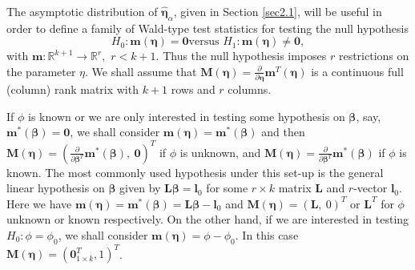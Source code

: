 \documentclass[a4paper]{article}%
\begin{document}
The asymptotic distribution of $\widehat{\boldsymbol{\eta}}_{\alpha}$, given
in Section \ref{sec2.1}, will be useful in order to define a family of
Wald-type test statistics for testing the null hypothesis
\begin{equation}
H_{0}:\boldsymbol{m}\left(  \boldsymbol{\eta}\right)  =\boldsymbol{0}\text{
versus }H_{1}:\boldsymbol{m}\left(  \boldsymbol{\eta}\right)  \neq
\boldsymbol{0}, \label{EQ:hyp}%
\end{equation}
with $\boldsymbol{m}:\mathbb{R}^{k+1}\rightarrow\mathbb{R}^{r},$ $r<k+1$. Thus the null hypothesis imposes $r$ restrictions on the parameter $\eta$.  We
shall assume that $\boldsymbol{M}\left(  \boldsymbol{\eta}\right)
=\frac{\partial}{\partial\boldsymbol{\eta}}\boldsymbol{m}^{T}\left(
\boldsymbol{\eta}\right)  $ is a continuous full (column) rank matrix with $k+1$ rows
and $r$ columns.

If $\phi$ is known or we are only interested in testing some hypothesis on
$\boldsymbol{\beta}$, say, $\boldsymbol{m}^{\ast}\left( \boldsymbol{\beta
}\right) =\boldsymbol{0}$, we shall consider $\boldsymbol{m}\left(
\boldsymbol{\eta}\right) =\boldsymbol{m}^{\ast}\left( \boldsymbol{\beta
}\right) $ and then $\boldsymbol{M}\left( \boldsymbol{\eta}\right)  = \left(
\frac{\partial}{\partial\boldsymbol{\beta}^{T}}\boldsymbol{m}^{\ast}\left(
\boldsymbol{\beta}\right) , \ \boldsymbol{0}\right) ^{T}$ if $\phi$ is
unknown, and $\boldsymbol{M}\left( \boldsymbol{\eta}\right)  = \frac{\partial
}{\partial\boldsymbol{\beta}^T}\boldsymbol{m}^{\ast}\left( \boldsymbol{\beta
}\right) $ if $\phi$ is known. The most commonly used hypothesis under this
set-up is the general linear hypothesis on $\boldsymbol{\beta}$ given by
$\boldsymbol{L}\boldsymbol{\beta}=\boldsymbol{l}_{0}$ for some $r\times k$
matrix $\boldsymbol{L}$ and $r$-vector $\boldsymbol{l}_{0}$. Here we 
have $\boldsymbol{m}\left( \boldsymbol{\eta}\right) =\boldsymbol{m}^{\ast
}\left( \boldsymbol{\beta}\right)  =\boldsymbol{L}\boldsymbol{\beta
}-\boldsymbol{l}_{0}$ and $\boldsymbol{M}\left( \boldsymbol{\eta}\right)  =
\left( \boldsymbol{L}, \ 0\right) ^{T}$ or $\boldsymbol{L}^{T}$ for $\phi$
unknown or known respectively. On the other hand, if we are interested in
testing $H_{0}:\phi=\phi_{0}$, we shall consider $\boldsymbol{m}\left(
\boldsymbol{\eta}\right)  =\phi-\phi_{0}.$ In this case $\boldsymbol{M}\left(
\boldsymbol{\eta}\right)  =\left(  \boldsymbol{0}_{1\times k}^{T},1\right)
^{T}$.
\end{document}
